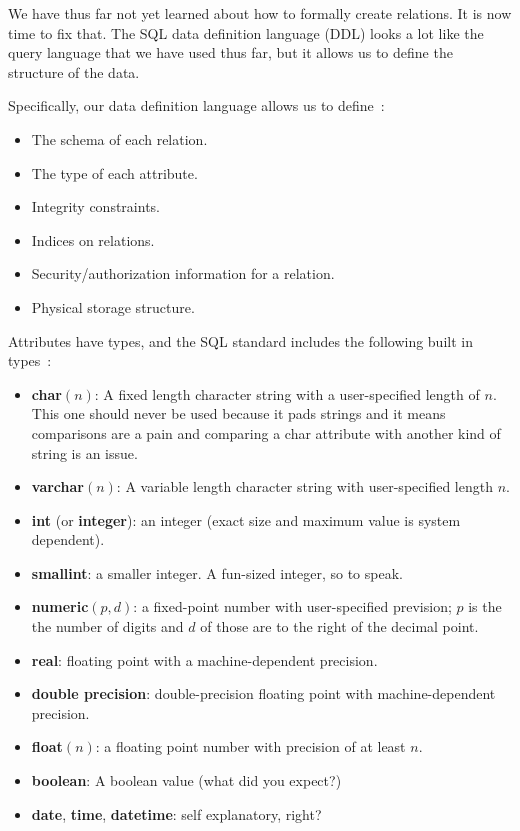 




We have thus far not yet learned about how to formally create relations. It is now time to fix that. The SQL data definition language (DDL) looks a lot like the query language that we have used thus far, but it allows us to define the structure of the data. 

Specifically, our data definition language allows us to define~\cite{dsc}:
\begin{itemize}
	\item The schema of each relation.
	\item The type of each attribute.
	\item Integrity constraints.
	\item Indices on relations.
	\item Security/authorization information for a relation.
	\item Physical storage structure.
\end{itemize}

Attributes have types, and the SQL standard includes the following built in types~\cite{dsc, fds}:

\begin{itemize}
\item \textbf{char}$(n)$: A fixed length character string with a user-specified length of $n$. This one should never be used because it pads strings and it means comparisons are a pain and comparing a char attribute with another kind of string is an issue.
\item \textbf{varchar}$(n)$: A variable length character string with user-specified length $n$.
\item \textbf{int} (or \textbf{integer}): an integer (exact size and maximum value is system dependent).
\item \textbf{smallint}: a smaller integer. A fun-sized integer, so to speak.
\item \textbf{numeric}$(p, d)$: a fixed-point number with user-specified prevision; $p$ is the the number of digits and $d$ of those are to the right of the decimal point.
\item \textbf{real}: floating point with a machine-dependent precision.
\item \textbf{double precision}: double-precision floating point with machine-dependent precision.
\item \textbf{float}$(n)$: a floating point number with precision of at least $n$.
\item \textbf{boolean}: A boolean value (what did you expect?)
\item \textbf{date}, \textbf{time}, \textbf{datetime}: self explanatory, right?
\end{itemize}


